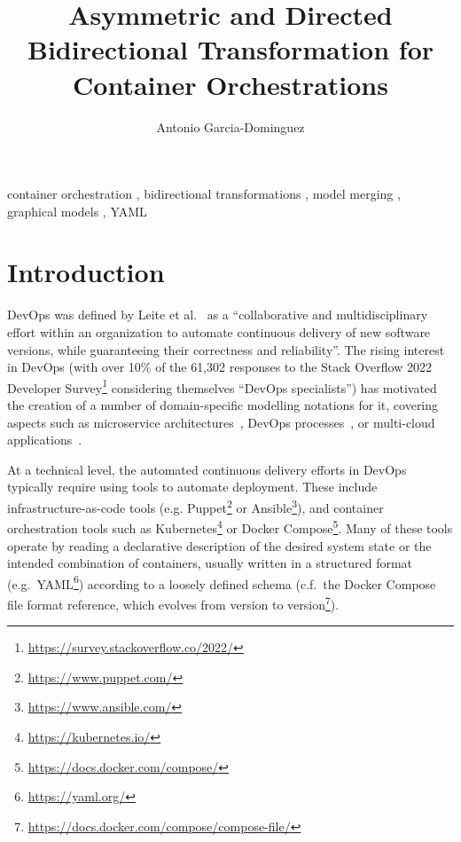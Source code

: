\documentclass[twocolumn]{ceurart}
\title{Asymmetric and Directed Bidirectional Transformation for Container Orchestrations}
\author[1]{Antonio Garcia-Dominguez}[
 email=a.garcia-dominguez@york.ac.uk,
 orcid=0000-0002-4744-9150,
]
\begin{document}
\begin{keywords}
container orchestration \sep
bidirectional transformations \sep
model merging \sep
graphical models \sep
YAML
\end{keywords}


\maketitle

\section{Introduction}

DevOps was defined by Leite et al.~\cite{leite_survey_2020} as a ``collaborative
and multidisciplinary effort within an organization to automate continuous
delivery of new software versions, while guaranteeing their correctness and
reliability''. The rising interest in DevOps (with over 10\% of the 61,302
responses to the Stack Overflow 2022 Developer
Survey\footnote{\url{https://survey.stackoverflow.co/2022/}} considering
themselves ``DevOps specialists'') has motivated the creation of a number of
domain-specific modelling notations for it, covering aspects such as
microservice architectures~\cite{sorgalla_applying_2021}, DevOps
processes~\cite{colantoni_devopsml_2020}, or multi-cloud
applications~\cite{ferry_cloudmf_2018}.

At a technical level, the automated continuous delivery efforts in DevOps
typically require using tools to automate deployment. These include
infrastructure-as-code tools (e.g.
Puppet\footnote{\url{https://www.puppet.com/}} or
Ansible\footnote{\url{https://www.ansible.com/}}), and container orchestration
tools such as Kubernetes\footnote{\url{https://kubernetes.io/}} or Docker
Compose\footnote{\url{https://docs.docker.com/compose/}}. Many of these tools
operate by reading a declarative description of the desired system state or the
intended combination of containers, usually written in a structured format
(e.g.\ YAML\footnote{\url{https://yaml.org/}}) according to a loosely defined
schema (c.f.\ the Docker Compose file format reference, which evolves from
version to
version\footnote{\url{https://docs.docker.com/compose/compose-file/}}).
\end{document}
